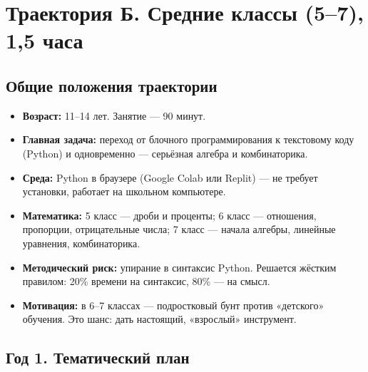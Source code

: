 \documentclass[12pt,a4paper]{article}
\begin{document}
\newpage
\section{Траектория Б. Средние классы (5--7), 1{,}5 часа}

\subsection{Общие положения траектории}

\begin{itemize}
  \item \textbf{Возраст:} 11--14 лет. Занятие --- 90 минут.
  \item \textbf{Главная задача:} переход от блочного программирования к
  текстовому коду (Python) и одновременно --- серьёзная алгебра и
  комбинаторика.
  \item \textbf{Среда:} Python в браузере (Google Colab или Replit) ---
  не требует установки, работает на школьном компьютере.
  \item \textbf{Математика:} 5 класс --- дроби и проценты;
  6 класс --- отношения, пропорции, отрицательные числа;
  7 класс --- начала алгебры, линейные уравнения, комбинаторика.
  \item \textbf{Методический риск:} упирание в синтаксис Python.
  Решается жёстким правилом: 20\% времени на синтаксис, 80\% --- на смысл.
  \item \textbf{Мотивация:} в 6--7 классах --- подростковый бунт против
  «детского» обучения. Это шанс: дать настоящий, «взрослый» инструмент.
\end{itemize}

\subsection{Год 1. Тематический план}
\end{document}
